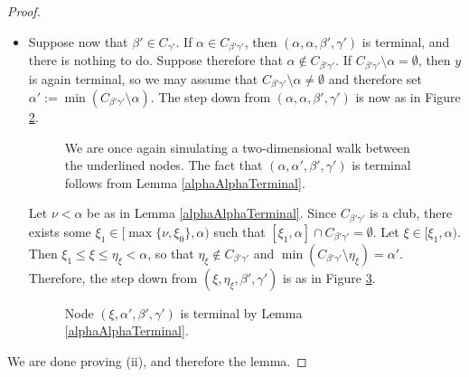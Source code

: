 \documentclass{amsart}
\numberwithin{theorem}{section}
\theoremstyle{definition}
\begin{document}
\begin{proof}
\begin{itemize}
\begin{figure}[H]
\caption{Again, the walk simulates a two-dimensional walk, this time down from the node $(\eta_\xi,\beta',\gamma')$. The node $(\xi,\beta',\beta'',\gamma')$ is terminal by Lemma \ref{alphaAlphaTerminal}.
Note also that the node $(\xi,\beta'',\beta',\gamma')$ showcases an instance of (iii).}
\label{second_step_new_xi}
\end{figure}

Comparing figures \ref{second_step_new} and \ref{second_step_new_xi}, we see that (ii) holds at the immediate successors of $y$.

\item Suppose now that $\beta'\in C_{\gamma'}$. If $\alpha\in C_{\beta'\gamma'}$, then $(\alpha,\alpha,\beta',\gamma')$ is terminal, and there is nothing to do. Suppose therefore that $\alpha\not\in C_{\beta'\gamma'}$. If $C_{\beta'\gamma'}\setminus\alpha=\emptyset$, then $y$ is again terminal, so we may assume that $C_{\beta'\gamma'}\setminus\alpha\neq\emptyset$ and therefore set $\alpha':=\min(C_{\beta'\gamma'}\setminus\alpha)$. The step down from $(\alpha,\alpha,\beta',\gamma')$ is now as in Figure \ref{second_step_new2}.

\begin{figure}[h]
\caption{We are once again simulating a two-dimensional walk between the underlined nodes. The fact that $(\alpha,\alpha',\beta',\gamma')$ is terminal follows from Lemma \ref{alphaAlphaTerminal}.}
\label{second_step_new2}
\end{figure}

Let $\nu<\alpha$ be as in Lemma \ref{alphaAlphaTerminal}. Since $C_{\beta'\gamma'}$ is a club, there exists some $\xi_1\in [\max\{\nu,\xi_0\},\alpha)$ such that $[\xi_1,\alpha]\cap C_{\beta'\gamma'}=\emptyset$.  Let $\xi\in [\xi_1,\alpha)$. Then $\xi_1\le \xi \le \eta_\xi < \alpha$, so that $\eta_\xi\not\in C_{\beta'\gamma'}$ and $\min(C_{\beta'\gamma'}\setminus\eta_\xi)=\alpha'$. Therefore, the step down from $(\xi,\eta_\xi,\beta',\gamma')$ is as in Figure \ref{second_step_new_xi2}.

\begin{figure}[h]
\caption{Node $(\xi,\alpha',\beta',\gamma')$ is terminal by Lemma \ref{alphaAlphaTerminal}.}
\label{second_step_new_xi2}
\end{figure}
\end{itemize}
We are done proving (ii), and therefore the lemma.\end{proof}
\end{document}
